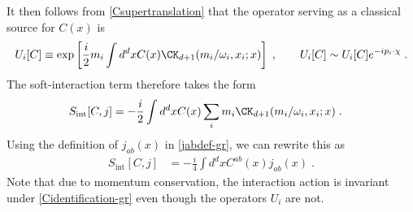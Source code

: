 \documentclass[11pt]{article}
\def\o{{\omega}}
\begin{document}
It then follows from \eqref{Csupertranslation} that the operator serving as a classical source for $C(x)$ is 
\begin{equation}
\begin{split}
U_i[C] \equiv \exp \left[ \frac{i}{2} m_i \int d^d x C(x) \CK_{d+1} ( m_i / \o_i , x_i ; x ) \right] \; , \qquad U_i[C]  \sim U_i[C] e^{ - i p_i \cdot \chi } \; . 
\end{split}
\end{equation}
The soft-interaction term therefore takes the form
\begin{equation}
\begin{split}
S_{\text{int}} [ C , j ]  &= - \frac{i}{2} \int d^d x C(x) \sum_i m_i \CK_{d+1}  ( m_i / \o_i , x_i ; x ) \; .
\end{split}
\end{equation}
Using the definition of $j_{ab}(x)$ in \eqref{jabdef-gr}, we can rewrite this as
\begin{equation}
\begin{split}
S_{\text{int}} [ C , j ]  &= - \frac{i}{4} \int d^d x C^{ab} (x) j_{ab}(x)  \; .
\end{split}
\end{equation}
Note that due to momentum conservation, the interaction action is invariant under \eqref{Cidentification-gr} even though the operators $U_i$ are not.
\end{document}
